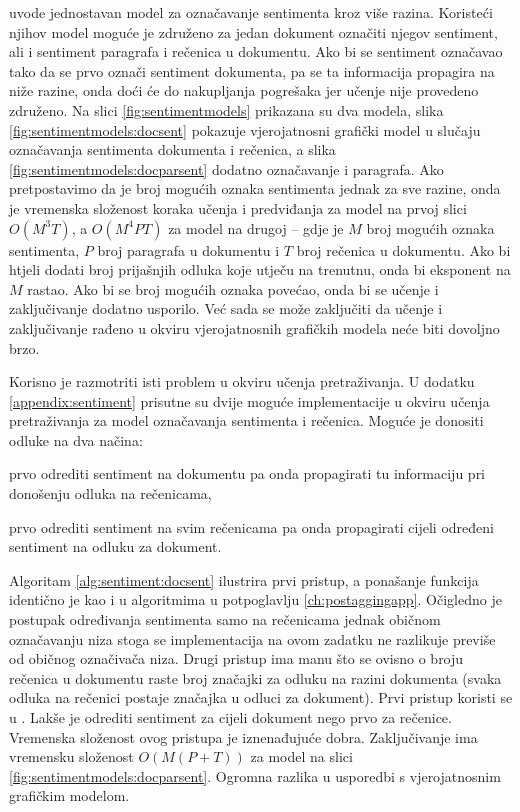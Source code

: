 \citet{mcdonald2007structured} uvode jednostavan model za označavanje sentimenta
kroz više razina. Koristeći njihov model moguće je združeno za jedan dokument
označiti njegov sentiment, ali i sentiment paragrafa i rečenica u dokumentu. Ako
bi se sentiment označavao tako da se prvo označi sentiment dokumenta, pa se ta
informacija propagira na niže razine, onda doći će do nakupljanja pogrešaka jer
učenje nije provedeno združeno. Na slici \ref{fig:sentimentmodels} prikazana su
dva modela, slika \ref{fig:sentimentmodels:docsent} pokazuje vjerojatnosni
grafički model u slučaju označavanja sentimenta dokumenta i rečenica, a slika
\ref{fig:sentimentmodels:docparsent} dodatno označavanje i paragrafa. Ako
pretpostavimo da je broj mogućih oznaka sentimenta jednak za sve razine, onda je
vremenska složenost koraka učenja i predviđanja za model na prvoj slici $O(M^3
T)$, a $O(M^4 P T)$ za model na drugoj -- gdje je $M$ broj mogućih oznaka
sentimenta, $P$ broj paragrafa u dokumentu i $T$ broj rečenica u dokumentu. Ako
bi htjeli dodati broj prijašnjih odluka koje utječu na trenutnu, onda bi
eksponent na $M$ rastao. Ako bi se broj mogućih oznaka povećao, onda bi se
učenje i zaključivanje dodatno usporilo. Već sada se može zaključiti da učenje i
zaključivanje rađeno u okviru vjerojatnosnih grafičkih modela neće biti dovoljno
brzo.

Korisno je razmotriti isti problem u okviru učenja pretraživanja. U dodatku
\ref{appendix:sentiment} prisutne su dvije moguće implementacije u okviru učenja
pretraživanja za model označavanja sentimenta i rečenica. Moguće je donositi
odluke na dva načina:
\begin{inlinelist}
  \item prvo odrediti sentiment na dokumentu pa onda propagirati tu informaciju
  pri donošenju odluka na rečenicama,
  \item prvo odrediti sentiment na svim rečenicama pa onda propagirati cijeli
  određeni sentiment na odluku za dokument.
\end{inlinelist}
Algoritam \ref{alg:sentiment:docsent} ilustrira prvi pristup, a ponašanje
funkcija identično je kao i u algoritmima u potpoglavlju \ref{ch:postaggingapp}.
Očigledno je postupak određivanja sentimenta samo na rečenicama jednak običnom
označavanju niza stoga se implementacija na ovom zadatku ne razlikuje previše od
običnog označivača niza. Drugi pristup ima manu što se ovisno o broju rečenica u
dokumentu raste broj značajki za odluku na razini dokumenta (svaka odluka na
rečenici postaje značajka u odluci za dokument). Prvi pristup koristi se u
\citet{mcdonald2007structured}. Lakše je odrediti sentiment za cijeli dokument
nego prvo za rečenice. Vremenska složenost ovog pristupa je iznenađujuće dobra.
Zaključivanje ima vremensku složenost $O(M (P + T))$ za model na slici
\ref{fig:sentimentmodels:docparsent}. Ogromna razlika u usporedbi s
vjerojatnosnim grafičkim modelom.

